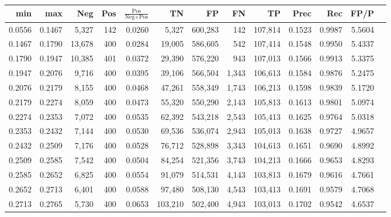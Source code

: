 \begin{tabular}{rrrrrrrrrrrrr}
\toprule
   min &    max &    Neg & Pos & $\frac{\text{Pos}}{\text{Neg}+\text{Pos}}$ &      TN &      FP &      FN &      TP &   Prec &    Rec &   FP/P \\
\midrule
0.0556 & 0.1467 &  5,327 & 142 &                                     0.0260 &   5,327 & 600,283 &     142 & 107,814 & 0.1523 & 0.9987 & 5.5604 \\
0.1467 & 0.1790 & 13,678 & 400 &                                     0.0284 &  19,005 & 586,605 &     542 & 107,414 & 0.1548 & 0.9950 & 5.4337 \\
0.1790 & 0.1947 & 10,385 & 401 &                                     0.0372 &  29,390 & 576,220 &     943 & 107,013 & 0.1566 & 0.9913 & 5.3375 \\
0.1947 & 0.2076 &  9,716 & 400 &                                     0.0395 &  39,106 & 566,504 &   1,343 & 106,613 & 0.1584 & 0.9876 & 5.2475 \\
0.2076 & 0.2179 &  8,155 & 400 &                                     0.0468 &  47,261 & 558,349 &   1,743 & 106,213 & 0.1598 & 0.9839 & 5.1720 \\
0.2179 & 0.2274 &  8,059 & 400 &                                     0.0473 &  55,320 & 550,290 &   2,143 & 105,813 & 0.1613 & 0.9801 & 5.0974 \\
0.2274 & 0.2353 &  7,072 & 400 &                                     0.0535 &  62,392 & 543,218 &   2,543 & 105,413 & 0.1625 & 0.9764 & 5.0318 \\
0.2353 & 0.2432 &  7,144 & 400 &                                     0.0530 &  69,536 & 536,074 &   2,943 & 105,013 & 0.1638 & 0.9727 & 4.9657 \\
0.2432 & 0.2509 &  7,176 & 400 &                                     0.0528 &  76,712 & 528,898 &   3,343 & 104,613 & 0.1651 & 0.9690 & 4.8992 \\
0.2509 & 0.2585 &  7,542 & 400 &                                     0.0504 &  84,254 & 521,356 &   3,743 & 104,213 & 0.1666 & 0.9653 & 4.8293 \\
0.2585 & 0.2652 &  6,825 & 400 &                                     0.0554 &  91,079 & 514,531 &   4,143 & 103,813 & 0.1679 & 0.9616 & 4.7661 \\
0.2652 & 0.2713 &  6,401 & 400 &                                     0.0588 &  97,480 & 508,130 &   4,543 & 103,413 & 0.1691 & 0.9579 & 4.7068 \\
0.2713 & 0.2765 &  5,730 & 400 &                                     0.0653 & 103,210 & 502,400 &   4,943 & 103,013 & 0.1702 & 0.9542 & 4.6537 \\

\end{tabular}
